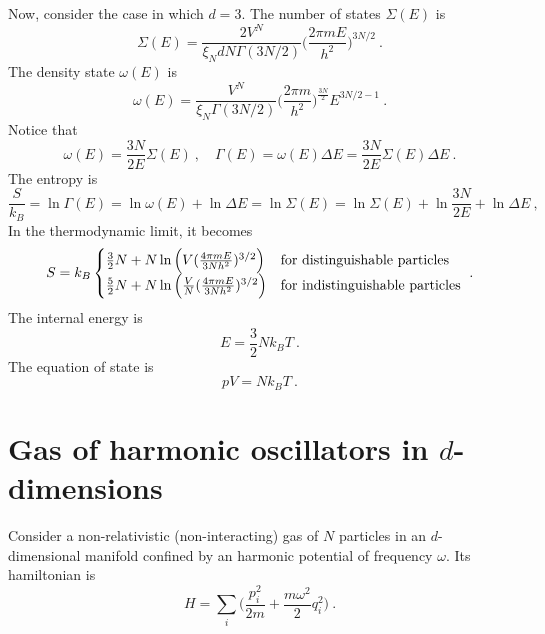    Now, consider the case in which $d = 3$.
    The number of states $\Sigma(E)$ is 
    \begin{equation*}
        \Sigma(E) = \frac{2V^{N}}{\xi_N d N \Gamma(3N/2)} \Big ( \frac{2 \pi m E}{h^2}\Big)^{3N/2} ~.
    \end{equation*}
    The density state $\omega(E)$ is
    \begin{equation*}
        \omega (E) = \frac{V^N}{\xi_N \Gamma(3N/2)} \Big ( \frac{2 \pi m}{h^2} \Big )^{\frac{3N}{2}} E^{3N/2-1} ~.
    \end{equation*}
    Notice that 
    \begin{equation*}
        \omega(E) = \frac{3N}{2E} \Sigma(E) ~, \quad \Gamma(E) = \omega(E) \Delta E = \frac{3N}{2E} \Sigma(E) \Delta E ~.
    \end{equation*}
    The entropy is 
    \begin{equation*}
        \frac{S}{k_B} = \ln \Gamma(E) = \ln \omega(E) + \ln \Delta E = \ln \Sigma(E) = \ln \Sigma(E) + \ln \frac{3N}{2E} + \ln \Delta E ~,
    \end{equation*}
    In the thermodynamic limit, it becomes
    \begin{equation*}
        S = k_B \begin{cases}
            \frac{3}{2} N + N \ln \Big ( V (\frac{4 \pi m E}{3 N h^2})^{3/2} \Big) & \textnormal{for distinguishable particles} \\
            \frac{5}{2} N + N \ln \Big ( \frac{V}{N} (\frac{4 \pi m E}{3 N h^2})^{3/2} \Big) & \textnormal{for indistinguishable particles} \\
        \end{cases} ~.
    \end{equation*}
    The internal energy is 
    \begin{equation*}
        E = \frac{3}{2} N k_B T ~.
    \end{equation*}
    The equation of state is  
    \begin{equation*}
        p V = N k_B T ~.
    \end{equation*}

\section{Gas of harmonic oscillators in $d$-dimensions}

    Consider a non-relativistic (non-interacting) gas of $N$ particles in an $d$-dimensional manifold confined by an harmonic potential of frequency $\omega$. Its hamiltonian is 
    \begin{equation*}
        H = \sum_i \Big ( \frac{p^2_i}{2m} + \frac{m \omega^2}{2} q_i^2 \Big ) ~.
    \end{equation*}


